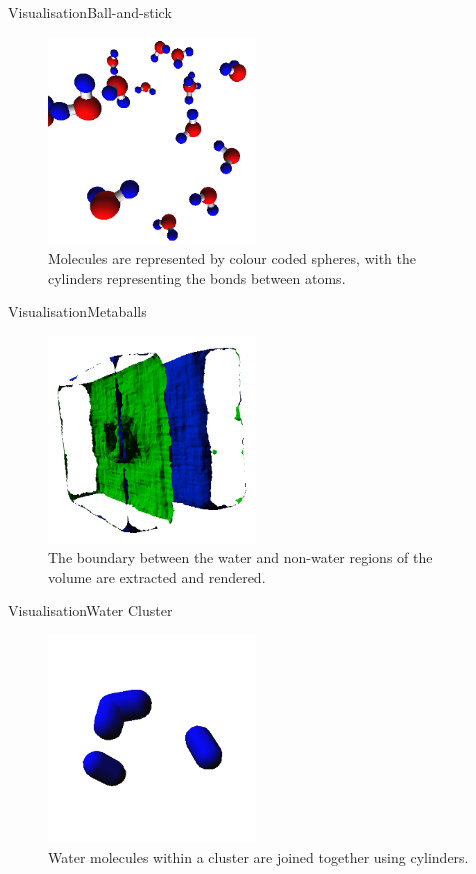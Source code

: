 \documentclass{beamer}
\begin{document}
\begin{frame}{Visualisation}{Ball-and-stick}
\begin{figure}
  \centering
  \includegraphics[width=55mm]{min-images/ball-and-stick.png}
  \caption{Molecules are represented by colour coded spheres, with the cylinders representing the bonds between atoms.}
\end{figure}
\end{frame}

\begin{frame}{Visualisation}{Metaballs}
\begin{figure}
  \centering
  \includegraphics[width=55mm]{min-images/metaballs.png}
  \caption{The boundary between the water and non-water regions of the volume are extracted and rendered.}
\end{figure}
\end{frame}

\begin{frame}{Visualisation}{Water Cluster}
\begin{figure}
  \centering
  \includegraphics[width=55mm]{min-images/water-cluster.png}
  \caption{Water molecules within a cluster are joined together using cylinders.}
\end{figure}
\end{frame}
\end{document}
